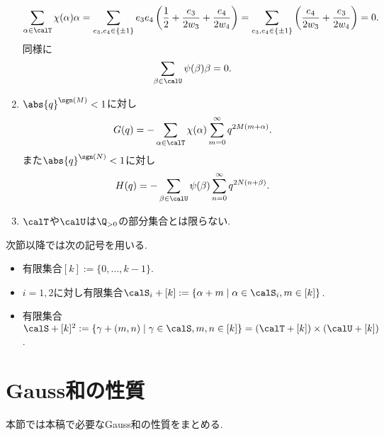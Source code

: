 \documentclass[11pt,b5paper,oneside,lualatex]{ltjsarticle} %
\numberwithin{equation}{section} %
\begin{document}
\begin{rem}
\begin{enumerate}
\begin{align}
			\sum_{\alpha \in \calT} \chi(\alpha) \alpha 
			=
			\sum_{ e_3, e_4 \in \{ \pm 1 \} }
			e_3 e_4 \left( \frac{1}{2} + \frac{e_3}{2w_3} + \frac{e_4}{2w_4} \right)
			=
			\sum_{ e_3, e_4 \in \{ \pm 1 \} }
			\left( \frac{e_4}{2w_3} + \frac{e_3}{2w_4} \right)
			= 0.
		\end{align}
		同様に
		\[		
		\sum_{\beta \in \calU} \psi(\beta) \beta = 0.
		\]
		\item \label{item:rem:G(q)_calS_expansion}
		$ \abs{q}^{\sgn(M)} < 1 $に対し
		\[
		G(q) = -\sum_{\alpha \in \calT} \chi(\alpha) \sum_{m=0}^{\infty} q^{2M(m + \alpha)}.
		\]
		また$ \abs{q}^{\sgn(N)} < 1 $に対し
		\[
		H(q) = -\sum_{\beta \in \calU} \psi(\beta) \sum_{n=0}^{\infty} q^{2N(n + \beta)}.
		\]
		\item \label{item:rem:G(q)_calS_positive}
		$ \calT $や$ \calU $は$ \Q_{>0} $の部分集合とは限らない. 		
	\end{enumerate}
\end{rem}

次節以降では次の記号を用いる. 

\begin{dfn}
	\begin{itemize}
		\item 有限集合$ [k] := \{ 0, \dots, k-1 \} $.
		\item $ i = 1, 2 $に対し有限集合$ \calS_i + [k] := \{ \alpha + m \mid \alpha \in \calS_i, m \in [k] \} $.
		\item 有限集合$ \calS + [k]^2 := \{ \gamma + (m, n) \mid \gamma \in \calS, m, n \in [k] \} = (\calT + [k]) \times (\calU + [k]) $.
	\end{itemize}
\end{dfn}


\section{Gauss和の性質} \label{sec:Gauss_sum}


本節では本稿で必要なGauss和の性質をまとめる. 
\end{document}
